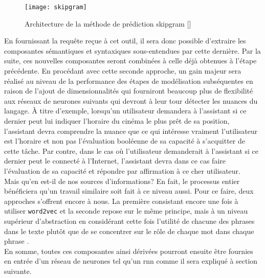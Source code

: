 \begin{figure}[ht]
  \centering
  \texttt{[image: skipgram]}
  \caption{Architecture de la méthode de prédiction \gls{skipgram} []}
  \label{fig:skipgram}
\end{figure}

En fournissant la requête reçue à cet outil, il sera donc possible d'extraire les composantes sémantiques et syntaxiques sous-entendues par cette dernière. Par la suite, ces nouvelles composantes seront combinées à celle déjà obtenues à l'étape précédente. En procédant avec cette seconde approche, un gain majeur sera réalisé au niveau de la performance des étapes de modélisation subséquentes en raison de l'ajout de dimensionnalités qui fourniront beaucoup plus de flexibilité aux réseaux de neurones suivants qui devront à leur tour détecter les nuances du langage. À titre d'exemple, lorsqu'un utilisateur demandera à l'assistant si ce dernier peut lui indiquer l'horaire du cinéma le plus prêt de sa position, l'assistant devra comprendre la nuance que ce qui intéresse vraiment l'utilisateur est l'horaire et non pas l'évaluation booléenne de sa capacité à s'acquitter de cette tâche. Par contre, dans le cas où l'utilisateur demanderait à l'assistant si ce dernier peut le connecté à l'Internet, l'assistant devra dans ce cas faire l'évaluation de sa capacité et répondre par affirmation à ce cher utilisateur. \\

Mais qu'en est-il de nos sources d'informations? En fait, le processus entier bénéficiera qu'un travail similaire soit fait à ce niveau aussi. Pour ce faire, deux approches s'offrent encore à nous. La première consistant encore une fois à utiliser \texttt{word2vec} et la seconde repose sur le même principe, mais à un niveau supérieur d'abstraction en considérant cette fois l'utilité de chacune des phrases dans le texte plutôt que de se concentrer sur le rôle de chaque mot dans chaque phrase \cite{inferSent}. \\

En somme, toutes ces composantes ainsi dérivées pourront ensuite être fournies en entrée d'un réseau de neurones tel qu'un \gls{rnn} comme il sera expliqué à section suivante.
